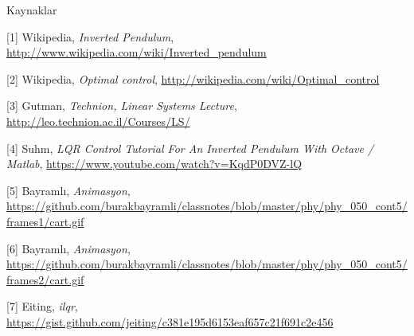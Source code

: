 \documentclass[12pt,fleqn]{article}\usepackage{../../common}
\begin{document}
Kaynaklar

[1] Wikipedia, {\em Inverted Pendulum}, \url{http://www.wikipedia.com/wiki/Inverted_pendulum}

[2] Wikipedia, {\em Optimal control}, \url{http://wikipedia.com/wiki/Optimal_control}

[3] Gutman, {\em Technion, Linear Systems Lecture}, \url{http://leo.technion.ac.il/Courses/LS/}

[4] Suhm, {\em LQR Control Tutorial For An Inverted Pendulum With Octave /
  Matlab}, \url{https://www.youtube.com/watch?v=KqdP0DVZ-lQ}

[5] Bayramlı, {\em Animasyon}, \url{https://github.com/burakbayramli/classnotes/blob/master/phy/phy_050_cont5/frames1/cart.gif}

[6] Bayramlı, {\em Animasyon}, \url{https://github.com/burakbayramli/classnotes/blob/master/phy/phy_050_cont5/frames2/cart.gif}

[7] Eiting, {\em ilqr}, \url{https://gist.github.com/jeiting/c381e195d6153eaf657c21f691c2e456}
\end{document}
